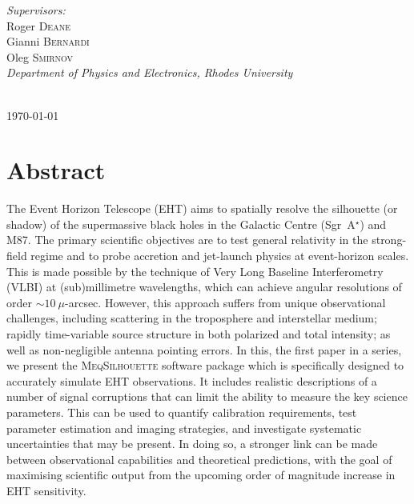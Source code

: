 \begin{titlepage}
\begin{minipage}{0.4\textwidth}
\begin{flushright} \large
\emph{Supervisors:} \\
Roger \textsc{Deane} \\
Gianni \textsc{Bernardi} \\
Oleg \textsc{Smirnov} \\
{\small \textit{Department of Physics and Electronics, Rhodes University}}
\end{flushright}
\end{minipage}\\[3cm]


{\large \today}\\[1.5cm] %

\vfill %

\end{titlepage}

\chapter*{Abstract}
 The Event Horizon Telescope (EHT) aims to spatially resolve the silhouette (or shadow) of the supermassive black holes in the Galactic Centre (Sgr~A$^\star$) and M87. The primary scientific objectives are to test general relativity in the strong-field regime and to probe accretion and jet-launch physics at event-horizon scales. This is made possible by the technique of Very Long Baseline Interferometry (VLBI) at (sub)millimetre wavelengths, which can achieve angular resolutions of order $\sim10~\mu$-arcsec. However, this approach suffers from unique observational challenges, including scattering in the troposphere and interstellar medium; rapidly time-variable source structure in both polarized and total intensity; as well as non-negligible antenna pointing errors. In this, the first paper in a series, we present the \textsc{MeqSilhouette} software package which is specifically designed to accurately simulate EHT observations. It includes realistic descriptions of a number of signal corruptions that can limit the ability to measure the key science parameters. This can be used to quantify calibration requirements, test parameter estimation and imaging strategies, and investigate systematic uncertainties that may be present. In doing so, a stronger link can be made between observational capabilities and theoretical predictions, with the goal of maximising scientific output from the upcoming order of magnitude increase in EHT sensitivity. 


